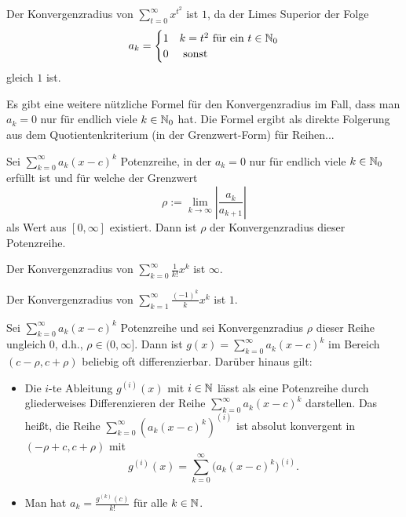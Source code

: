 \begin{bsp} 
	Der Konvergenzradius von $\sum_{t=0}^\infty x^{t^2}$ ist $1$, da der Limes Superior der Folge 
	\[
		a_k = \begin{cases}
			1 & k=t^2  \ \text{für ein $t \in \mathbb{N}_0$}
			\\ 0 & \ \text{sonst}
		\end{cases} 
	\]
	gleich $1$ ist. 
\end{bsp} 

\begin{bem}
	Es gibt eine weitere nützliche Formel für den Konvergenzradius im Fall, dass man $a_k=0$ nur für endlich viele $k \in \mathbb{N}_0$ hat. Die Formel ergibt als direkte Folgerung aus dem Quotientenkriterium (in der Grenzwert-Form) für Reihen...
\end{bem} 

\begin{thm} 
	Sei $\sum_{k=0}^\infty a_k (x-c)^k$ Potenzreihe, in der $a_k=0$ nur für endlich viele $k \in \mathbb{N}_0$ erfüllt ist und für welche der Grenzwert 
	\[
		\rho:=\lim_{k \to \infty} \left| \frac{a_k}{a_{k+1}} \right| 
	\] als Wert aus $[0,\infty]$ existiert. Dann ist  $\rho$ der Konvergenzradius dieser Potenzreihe. 
\end{thm} 

\begin{bsp} 
	Der Konvergenzradius von $\sum_{k=0}^\infty \frac{1}{k!} x^k$ ist $\infty$. 
\end{bsp} 

\begin{bsp} 
	Der Konvergenzradius von $\sum_{k=1}^\infty \frac{(-1)^k}{k} x^k$ ist $1$. 
\end{bsp} 

\begin{thm}
	Sei $\sum_{k=0}^\infty a_k (x-c)^k$ Potenzreihe und sei Konvergenzradius $\rho$ dieser Reihe ungleich $0$, d.h., $\rho \in (0,\infty]$. Dann ist $g(x) = \sum_{k=0}^\infty a_k (x-c)^k$ im Bereich $(c-\rho,c+\rho)$ beliebig oft differenzierbar. Darüber hinaus gilt:  
	\begin{itemize} 
	\item Die	$i$-te Ableitung $g^{(i)} (x)$ mit $i \in \mathbb{N}$ lässt als eine Potenzreihe durch gliederweises Differenzieren der Reihe $\sum_{k=0}^\infty a_k (x-c)^k$ darstellen. Das heißt, die Reihe $\sum_{k=0}^\infty ( a_k (x-c)^k)^{(i)}$ ist absolut konvergent in $(-\rho + c,c+\rho)$ mit
	\[
		g^{(i)}( x) = \sum_{k=0}^\infty \bigl( a_k (x-c)^k \bigr)^{(i)}.
	\]
	\item Man hat $a_k = \frac{g^{(k)}(c)}{k!}$ für alle $k \in \mathbb{N}$. 
	\end{itemize} 
\end{thm} 


